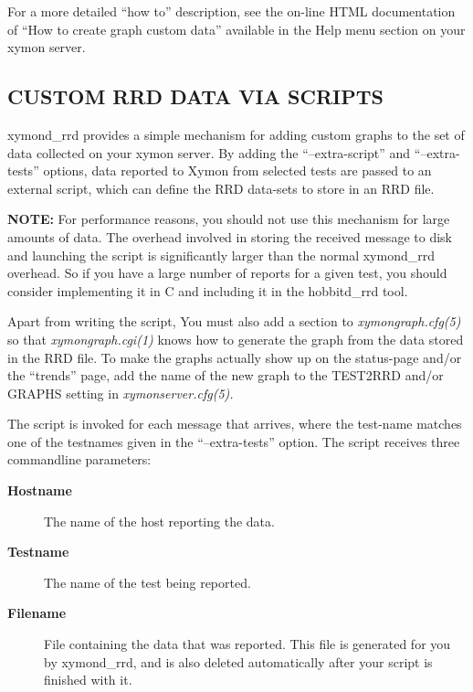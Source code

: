   For a more detailed ``how to'' description, see the on-line HTML documentation of ``How to create graph custom data'' available in the Help menu section on your xymon server. 


 


 
\subsection{CUSTOM RRD DATA VIA SCRIPTS}
 xymond\_rrd provides a simple mechanism for adding custom graphs to the set of data collected on your xymon server. By adding the ``--extra-script'' and ``--extra-tests'' options, data reported to Xymon from selected tests are passed to an external script, which can define the RRD data-sets to store in an RRD file. 

 \textbf{NOTE:}
 For performance reasons, you should not use this mechanism for large amounts of data. The overhead involved in storing the received message to disk and launching the script is significantly larger than the normal xymond\_rrd overhead. So if you have a large number of reports for a given test, you should consider implementing it in C and including it in the hobbitd\_rrd tool. 


  Apart from writing the script, You must also add a section to \emph{xymongraph.cfg(5)}
 so that \emph{xymongraph.cgi(1)}
 knows how to generate the graph from the data stored in the RRD file. To make the graphs actually show up on the status-page and/or the ``trends'' page, add the name of the new graph to the TEST2RRD and/or GRAPHS setting in \emph{xymonserver.cfg(5).}



  The script is invoked for each message that arrives, where the test-name matches one of the testnames given in the ``--extra-tests'' option. The script receives three commandline parameters: 


 \begin{description}
\item[\textbf{Hostname}
] The name of the host reporting the data. 
\item[\textbf{Testname}
] The name of the test being reported. 
\item[\textbf{Filename}
] File containing the data that was reported. This file is generated for you by xymond\_rrd, and is also deleted automatically after your script is finished with it. 

 


\end{description}



